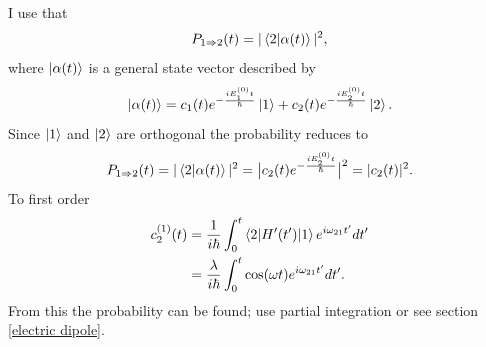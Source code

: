\begin{example}
\begin{enumerate}
		I use that
		\begin{equation}
			P_{1\Rightarrow 2}(t)=|\braket{2|\alpha(t)}|^2,
		\end{equation} 		
		where $\ket{\alpha(t)}$ is a general state vector described by
		\begin{equation}
			\ket{\alpha(t)}=c_1(t)e^{-\frac{iE_1^{(0)}t}{\hbar}}\ket{1}+c_2(t)e^{-\frac{iE_2^{(0)}t}{\hbar}}\ket{2}.
		\end{equation} 
		Since $\ket{1}$ and $\ket{2}$ are orthogonal the probability reduces to
		\begin{equation}
			P_{1\Rightarrow 2}(t)=|\braket{2|\alpha(t)}|^2=\big|c_2(t)e^{-\frac{iE_2^{(0)}t}{\hbar}}\big|^2=|c_2(t)|^2.
		\end{equation} 
		To first order
		\begin{equation}
			\begin{split}
				c_2^{(1)}(t)&=\frac{1}{i\hbar}\int_{0}^{t}\braket{2|H'(t')|1}e^{i\omega_{21}t'}dt'\\
				&=\frac{\lambda}{i\hbar}\int_{0}^{t}\cos(\omega t)e^{i\omega_{21}t'}dt'.\\
			\end{split}
		\end{equation} 
		From this the probability can be found; use partial integration or see section \ref{electric dipole}.
		
	\end{enumerate}
\end{example}

